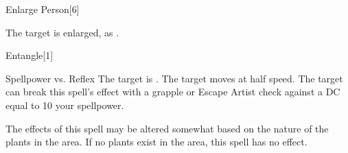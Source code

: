 \begin{spellsection}[Mass]{Enlarge Person}[6]
    \begin{spellheader}
    \end{spellheader}
    \begin{spellcontent}
        \begin{spelltargetinginfo}
        \end{spelltargetinginfo}
        \begin{spelleffects}
            \spelleffect The target is enlarged, as .
            \spelldur \durshort \dismissable
        \end{spelleffects}
    \end{spellcontent}
    \begin{spellfooter}
        \spellnotes \sizingspellnotes
        \miscastexplode
    \end{spellfooter}
\end{spellsection}

\begin{spellsection}{Entangle}[1]
    \begin{spellheader}
    \end{spellheader}
    \begin{spellcontent}
        \begin{spelltargetinginfo}
        \end{spelltargetinginfo}
        \begin{spelleffects}
            \begin{spellattack}{Spellpower vs. Reflex}
                \spellsuccess The target is \immobilized.
                \spellfailure The target moves at half speed.
                \spellspecial The target can break this spell's effect with a grapple or Escape Artist check against a DC equal to 10 \add your spellpower.
            \end{spellattack}
            \spelldur \durshort
        \end{spelleffects}
    \end{spellcontent}
    \begin{spellfooter}
        \spellnotes The effects of this spell may be altered somewhat based on the nature of the plants in the area. If no plants exist in the area, this spell has no effect.
        \miscastrandom
    \end{spellfooter}
\end{spellsection}


